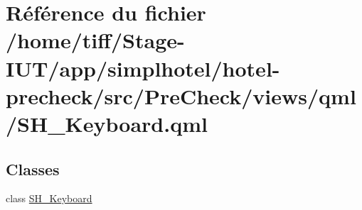 \hypertarget{SH__Keyboard_8qml}{\section{Référence du fichier /home/tiff/\-Stage-\/\-I\-U\-T/app/simplhotel/hotel-\/precheck/src/\-Pre\-Check/views/qml/\-S\-H\-\_\-\-Keyboard.qml}
\label{SH__Keyboard_8qml}
}
\subsection*{Classes}
\begin{DoxyCompactItemize}
\item 
class \hyperlink{classSH__Keyboard}{S\-H\-\_\-\-Keyboard}
\end{DoxyCompactItemize}
